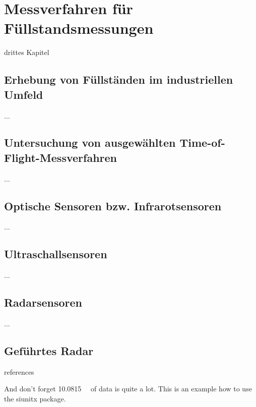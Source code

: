 \chapter{Messverfahren für F{\"u}llstandsmessungen}
drittes Kapitel


\section{Erhebung von F{\"u}llst{\"a}nden im industriellen Umfeld}
...

\section{Untersuchung von ausgew{\"a}hlten Time-of-Flight-Messverfahren}
...

\section{Optische Sensoren bzw. Infrarotsensoren}
...

\section{Ultraschallsensoren}
...

\section{Radarsensoren}
...

\section{Gef{\"u}hrtes Radar}
references


And don't forget \SI{10.0815}{\giga\byte} of data is quite a lot.
This is an example how to use the siunitx package.

